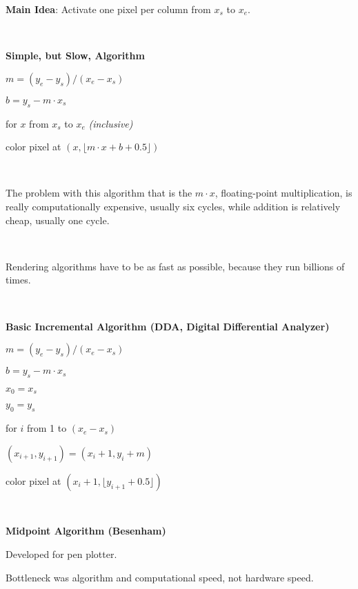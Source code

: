 \documentclass[12pt]{article}
\begin{document}
\begin{spacing}{1.2}
{\bf Main Idea}:  Activate one pixel per column from $x_s$ to $x_e$.  

\

\hfil{}

{\bf Simple, but Slow, Algorithm}

$m = (y_e - y_s) / (x_e - x_s)$

$b = y_s - m \cdot x_s$

for $x$ from $x_s$ to $x_e$ {\color{red} \it (inclusive)}

\qquad color pixel at $(x, \lfloor m \cdot x + b + 0.5 \rfloor)$

\

The problem with this algorithm that is the $m \cdot x$, floating-point multiplication, is really computationally expensive, usually six cycles, while addition is relatively cheap, usually one cycle.  

\

Rendering algorithms have to be as fast as possible, because they run billions of times.  

\

{\bf Basic Incremental Algorithm (DDA, Digital Differential Analyzer)}

$m = (y_e - y_s) / (x_e - x_s)$

$b = y_s - m \cdot x_s$

$x_0 = x_s$

$y_0 = y_s$

for $i$ from 1 to $(x_e - x_s)$

\qquad $(x_{i+1}, y_{i+1}) = (x_i + 1, y_i + m)$

\qquad color pixel at $(x_i+1, \lfloor y_{i+1} + 0.5 \rfloor )$ 

\

{\bf Midpoint Algorithm (Besenham)}

Developed for pen plotter.

Bottleneck was algorithm and computational speed, not hardware speed.


\end{spacing}
\end{document}
